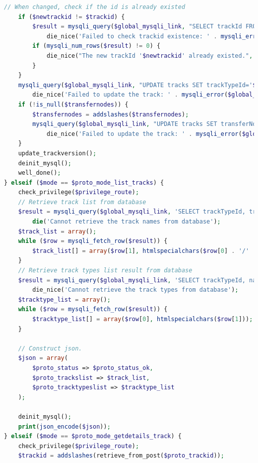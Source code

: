 \documentclass[a4paper,twoside]{article}
\begin{document}
\begin{enumerate}
\begin{lstlisting}[language=PHP,basicstyle=\tiny,caption=handle.php,label={lst:handle.php}]
	// When changed, check if the id is already existed
	if ($newtrackid != $trackid) {
		$result = mysqli_query($global_mysqli_link, "SELECT trackId FROM tracks WHERE trackId='$newtrackid'") or
			die_nice('Failed to check trackid existence: ' . mysqli_error($global_mysqli_link), true);
		if (mysqli_num_rows($result) != 0) {
			die_nice("The new trackId '$newtrackid' already existed.", true);
		}
	}
	mysqli_query($global_mysqli_link, "UPDATE tracks SET trackTypeId='$tracktype', trackId='$newtrackid', trackName='$trackname', internalInfo='$internalinfo', pathloop='$pathloop', penalty='$penalty' WHERE trackId='$trackid'") or
		die_nice('Failed to update the track: ' . mysqli_error($global_mysqli_link));
	if (!is_null($transfernodes)) {
		$transfernodes = addslashes($transfernodes);
		mysqli_query($global_mysqli_link, "UPDATE tracks SET transferNodes='$transfernodes'WHERE trackId='$trackid'") or
			die_nice('Failed to update the track: ' . mysqli_error($global_mysqli_link));
	}
	update_trackversion();
	deinit_mysql();
	well_done();
} elseif ($mode == $proto_mode_list_tracks) {
	check_privilege($privilege_route);
	// Retrieve track list from database
	$result = mysqli_query($global_mysqli_link, 'SELECT trackTypeId, trackId, trackName FROM tracks ORDER BY trackTypeId, trackId') or
		die('Cannot retrieve the track names from database');
	$track_list = array();	
	while ($row = mysqli_fetch_row($result)) {
		$track_list[] = array($row[1], htmlspecialchars($row[0] . '/' . $row[2]));
	}
	// Retrieve track types list result from database
	$result = mysqli_query($global_mysqli_link, 'SELECT trackTypeId, name FROM tracktypes ORDER BY trackTypeId') or
		die_nice('Cannot retrieve the track types from database');
	$tracktype_list = array();
	while ($row = mysqli_fetch_row($result)) {
		$tracktype_list[] = array($row[0], htmlspecialchars($row[1]));
	}
	
	// Construct json.
	$json = array(
		$proto_status => $proto_status_ok,
		$proto_trackslist => $track_list,
		$proto_tracktypeslist => $tracktype_list
	);
	
	deinit_mysql();
	print(json_encode($json));
} elseif ($mode == $proto_mode_getdetails_track) {
	check_privilege($privilege_route);
	$trackid = addslashes(retrieve_from_post($proto_trackid));


\end{lstlisting}
\end{enumerate}
\end{document}

